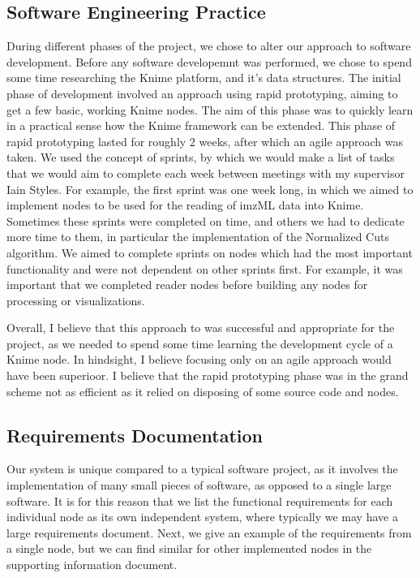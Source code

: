 \documentclass[11pt,openany]{book}
\begin{document}
\subsection{Software Engineering Practice}
During different phases of the project, we chose to alter our approach to software development. Before any software developemnt was performed, we chose to spend some time researching the Knime platform, and it's data structures. The initial phase of development involved an approach using rapid prototyping, aiming to get a few basic, working Knime nodes. The aim of this phase was to quickly learn in a practical sense how the Knime framework can be extended. This phase of rapid prototyping lasted for roughly 2 weeks, after which an agile approach was taken. We used the concept of sprints, by which we would make a list of tasks that we would aim to complete each week between meetings with my supervisor Iain Styles. For example, the first sprint was one week long, in which we aimed to implement nodes to be used for the reading of imzML data into Knime. Sometimes these sprints were completed on time, and others we had to dedicate more time to them, in particular the implementation of the Normalized Cuts algorithm. We aimed to complete sprints on nodes which had the most important functionality and were not dependent on other sprints first. For example, it was important that we completed reader nodes before building any nodes for processing or visualizations. 

Overall, I believe that this approach to was successful and appropriate for the project, as we needed to spend some time learning the development cycle of a Knime node. In hindsight, I believe focusing only on an agile approach would have been superioor. I believe that the rapid prototyping phase was in the grand scheme not as efficient as it relied on disposing of some source code and nodes.

\subsection{Requirements Documentation}
Our system is unique compared to a typical software project, as it involves the implementation of many small pieces of software, as opposed to a single large software. It is for this reason that we list the functional requirements for each individual node as its own independent system, where typically we may have a large requirements document. Next, we give an example of the requirements from a single node, but we can find similar for other implemented nodes in the supporting information document.
\end{document}
